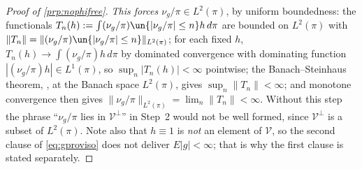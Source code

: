 \begin{proof}[Proof of \cref{prp:nophifree}]
\emph{This forces
$\nu_g/\pi\in L^{2}(\pi)$}, by uniform boundedness: the functionals
$T_n(h):=\int(\nu_g/\pi)\un\{|\nu_g/\pi|\le n\}h\,d\pi$ are bounded on $L^{2}(\pi)$ with
$\|T_n\|=\|(\nu_g/\pi)\un\{|\nu_g/\pi|\le n\}\|_{L^{2}(\pi)}$; for each fixed $h$,
$T_n(h)\to\int(\nu_g/\pi)h\,d\pi$ by
dominated convergence with dominating function $|(\nu_g/\pi)h|\in L^{1}(\pi)$, so $\sup_n|T_n(h)|<\infty$
pointwise; the Banach--Steinhaus theorem, \citet[Thm.~2.2]{brezis2011}, at the Banach space
$L^{2}(\pi)$, gives $\sup_n\|T_n\|<\infty$; and monotone convergence then
gives $\|\nu_g/\pi\|_{L^{2}(\pi)}=\lim_n\|T_n\|<\infty$. Without this step the phrase ``$\nu_g/\pi$ lies
in $\mathcal V^{\perp}$'' in Step~2 would not be well formed, since $\mathcal V^{\perp}$ is a subset of
$L^{2}(\pi)$. Note also that $h\equiv1$ is \emph{not} an element of $\mathcal V$, so the second clause of
\eqref{eq:gproviso} does not deliver $E|g|<\infty$; that is why the first clause is stated separately.


\end{proof}
